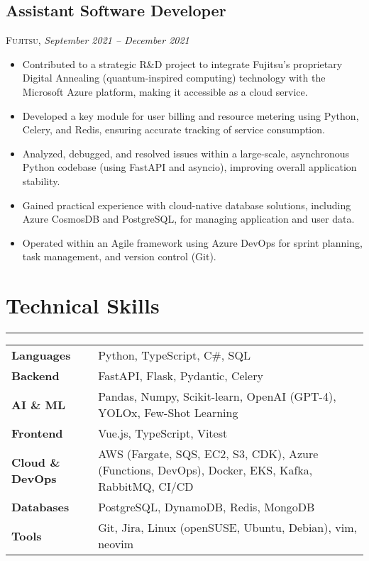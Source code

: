 \documentclass[10pt, a4paper]{article} %
\begin{document}
\subsection*{Assistant Software Developer}
\textsc{Fujitsu}, \textit{September 2021 – December 2021}
\begin{itemize}
    \itemsep -0.3em %
    \item Contributed to a strategic R\&D project to integrate Fujitsu's proprietary Digital Annealing (quantum-inspired computing) technology with the Microsoft Azure platform, making it accessible as a cloud service.
    \item Developed a key module for user billing and resource metering using Python, Celery, and Redis, ensuring accurate tracking of service consumption.
    \item Analyzed, debugged, and resolved issues within a large-scale, asynchronous Python codebase (using FastAPI and asyncio), improving overall application stability.
    \item Gained practical experience with cloud-native database solutions, including Azure CosmosDB and PostgreSQL, for managing application and user data.
    \item Operated within an Agile framework using Azure DevOps for sprint planning, task management, and version control (Git).
\end{itemize}

\section*{Technical Skills}
\hrule
\vspace{0.2cm}
\begin{tabular}{@{}p{} p{}}
    \textbf{Languages} & Python, TypeScript, C\#, SQL \\
    \textbf{Backend} & FastAPI, Flask, Pydantic, Celery \\
    \textbf{AI \& ML} & Pandas, Numpy, Scikit-learn, OpenAI (GPT-4), YOLOx, Few-Shot Learning \\
    \textbf{Frontend} & Vue.js, TypeScript, Vitest \\
    \textbf{Cloud \& DevOps} & AWS (Fargate, SQS, EC2, S3, CDK), Azure (Functions, DevOps), Docker, EKS, Kafka, RabbitMQ, CI/CD \\
    \textbf{Databases} & PostgreSQL, DynamoDB, Redis, MongoDB \\
    \textbf{Tools} & Git, Jira, Linux (openSUSE, Ubuntu, Debian), vim, neovim \\
\end{tabular}
\end{document}
